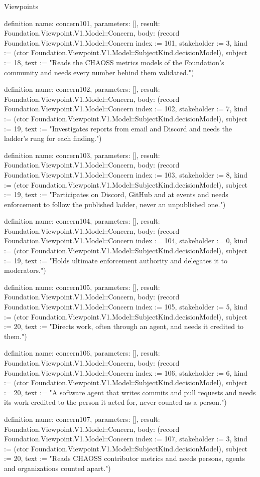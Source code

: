 \begin{lexlean}{Viewpoints}
\begin{semanticmodule}
definition{
  name: concern101,
  parameters: [],
  result: Foundation.Viewpoint.V1.Model::Concern,
  body: (record Foundation.Viewpoint.V1.Model::Concern {index := 101, stakeholder := 3, kind := (ctor Foundation.Viewpoint.V1.Model::SubjectKind.decisionModel), subject := 18, text := "Reads the CHAOSS metrics models of the Foundation's community and needs every number behind them validated."})
}

definition{
  name: concern102,
  parameters: [],
  result: Foundation.Viewpoint.V1.Model::Concern,
  body: (record Foundation.Viewpoint.V1.Model::Concern {index := 102, stakeholder := 7, kind := (ctor Foundation.Viewpoint.V1.Model::SubjectKind.decisionModel), subject := 19, text := "Investigates reports from email and Discord and needs the ladder's rung for each finding."})
}

definition{
  name: concern103,
  parameters: [],
  result: Foundation.Viewpoint.V1.Model::Concern,
  body: (record Foundation.Viewpoint.V1.Model::Concern {index := 103, stakeholder := 8, kind := (ctor Foundation.Viewpoint.V1.Model::SubjectKind.decisionModel), subject := 19, text := "Participates on Discord, GitHub and at events and needs enforcement to follow the published ladder, never an unpublished one."})
}

definition{
  name: concern104,
  parameters: [],
  result: Foundation.Viewpoint.V1.Model::Concern,
  body: (record Foundation.Viewpoint.V1.Model::Concern {index := 104, stakeholder := 0, kind := (ctor Foundation.Viewpoint.V1.Model::SubjectKind.decisionModel), subject := 19, text := "Holds ultimate enforcement authority and delegates it to moderators."})
}

definition{
  name: concern105,
  parameters: [],
  result: Foundation.Viewpoint.V1.Model::Concern,
  body: (record Foundation.Viewpoint.V1.Model::Concern {index := 105, stakeholder := 5, kind := (ctor Foundation.Viewpoint.V1.Model::SubjectKind.decisionModel), subject := 20, text := "Directs work, often through an agent, and needs it credited to them."})
}

definition{
  name: concern106,
  parameters: [],
  result: Foundation.Viewpoint.V1.Model::Concern,
  body: (record Foundation.Viewpoint.V1.Model::Concern {index := 106, stakeholder := 6, kind := (ctor Foundation.Viewpoint.V1.Model::SubjectKind.decisionModel), subject := 20, text := "A software agent that writes commits and pull requests and needs its work credited to the person it acted for, never counted as a person."})
}

definition{
  name: concern107,
  parameters: [],
  result: Foundation.Viewpoint.V1.Model::Concern,
  body: (record Foundation.Viewpoint.V1.Model::Concern {index := 107, stakeholder := 3, kind := (ctor Foundation.Viewpoint.V1.Model::SubjectKind.decisionModel), subject := 20, text := "Reads CHAOSS contributor metrics and needs persons, agents and organizations counted apart."})
}


\end{semanticmodule}
\end{lexlean}
